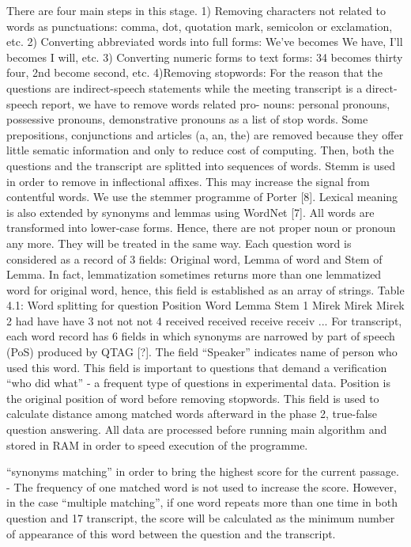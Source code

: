 \documentclass[11pt]{article}
\begin{document}
There are four main steps in this stage.
1) Removing characters not related to words as punctuations: comma, dot, quotation
mark, semicolon or exclamation, etc.
2) Converting abbreviated words into full forms: We've becomes We have, I'll becomes I
will, etc.
3) Converting numeric forms to text forms: 34 becomes thirty four, 2nd become second,
etc.
4)Removing stopwords: For the reason that the questions are indirect-speech statements
while the meeting transcript is a direct-speech report, we have to remove words related pro-
nouns: personal pronouns, possessive pronouns, demonstrative
pronouns as a list of stop words. Some prepositions, conjunctions 
and articles (a, an, the) are removed because they offer little sematic information and only
to reduce cost of computing.
Then, both the questions and the transcript are splitted into sequences of words. Stemm
is used in order to remove in
inflectional affixes. This may increase the signal from contentful
words. We use the stemmer programme of Porter [8]. Lexical meaning is also extended by
synonyms and lemmas using WordNet [7]. All words are transformed into lower-case forms.
Hence, there are not proper noun or pronoun any more. They will be treated in the same way.
Each question word is considered as a record of 3 fields: Original word, Lemma of word
and Stem of Lemma. In fact, lemmatization sometimes returns more than one lemmatized
word for original word, hence, this field is established as an array of strings.
Table 4.1: Word splitting for question
Position Word Lemma Stem
1 Mirek Mirek Mirek
2 had have have
3 not not not
4 received received receive receiv
...
For transcript, each word record has 6 fields in which synonyms are narrowed by part
of speech (PoS) produced by QTAG [?]. The field ``Speaker'' indicates name of person who
used this word. This field is important to questions that demand a verification ``who did
what'' - a frequent type of questions in experimental data.  Position is the original position
of word before removing stopwords. This field is used to calculate distance among matched
words afterward in the phase 2, true-false question answering.
All data are processed before running main algorithm and stored in RAM in order to
speed execution of the programme.

``synonyms matching'' in order to bring the highest score for the current passage.
- The frequency of one matched word is not used to increase the score. However, in the
case ``multiple matching'', if one word repeats more than one time in both question and
17
transcript, the score will be calculated as the minimum number of appearance of this word
between the question and the transcript.
\end{document}
